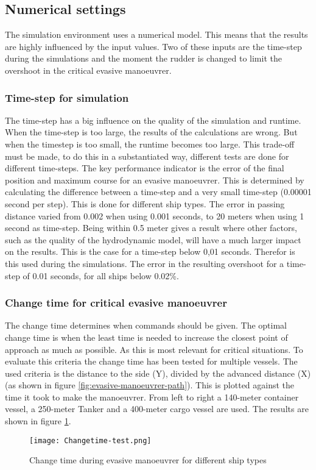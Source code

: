 \subsection{Numerical settings}
The simulation environment uses a numerical model. This means that the results are highly influenced by the input values. Two of these inputs are the time-step during the simulations and the moment the rudder is changed to limit the overshoot in the critical evasive manoeuvrer.

\subsubsection{Time-step for simulation}
The time-step has a big influence on the quality of the simulation and runtime. When the time-step is too large, the results of the calculations are wrong. But when the timestep is too small, the runtime becomes too large. This trade-off must be made, to do this in a substantiated way, different tests are done for different time-steps. 
The key performance indicator is the error of the final position and maximum course for an evasive manoeuvrer. This is determined by calculating the difference between a time-step and a very small time-step (0.00001 second per step). This is done for different ship types. The error in passing distance varied from 0.002 when using 0.001 seconds, to 20 meters when using 1 second as time-step. Being within 0.5 meter gives a result where other factors, such as the quality of the hydrodynamic model, will have a much larger impact on the results. This is the case for a time-step below 0,01 seconds. Therefor is this used during the simulations. The error in the resulting overshoot for a time-step of 0.01 seconds, for all ships below 0.02\%. 

\subsubsection{Change time for critical evasive manoeuvrer}
\label{apps:change-time}
The change time determines when commands should be given. The optimal change time is when the least time is needed to increase the closest point of approach as much as possible. As this is most relevant for critical situations.
To evaluate this criteria the change time has been tested for multiple vessels. The used criteria is the distance to the side (Y), divided by the advanced distance (X) (as shown in figure \ref{fig:evasive-manoeuvrer-path}). This is plotted against the time it took to make the manoeuvrer. From left to right a 140-meter container vessel, a 250-meter Tanker and a 400-meter cargo vessel are used. The results are shown in figure \ref{fig:change-time}.
\begin{figure}[p]
	\centering
	\texttt{[image: Changetime-test.png]}
	\caption{Change time during evasive manoeuvrer for different ship types}
	\label{fig:change-time} 
\end{figure}

